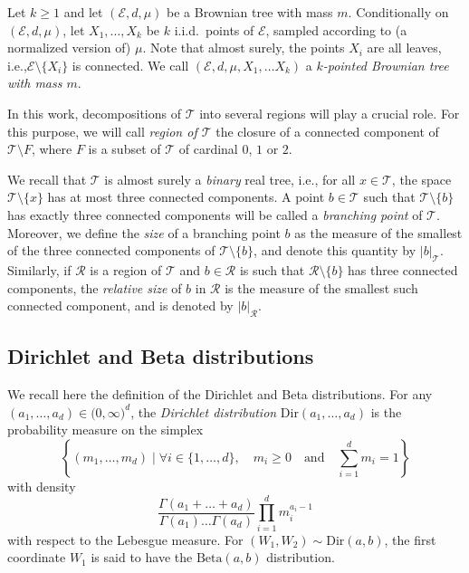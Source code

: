 \documentclass[11pt]{article}
\newcommand{\ie}{i.e.,\xspace}
\let\backslash\setminus
\newcommand{\intervalle}[4]{\mathopen{#1}#2\mathclose{}\mathpunct{},#3\mathclose{#4}}
\newcommand{\intervalleoo}[2]{\intervalle{(}{#1}{#2}{)}}
\newcommand{\Tt}{\mathcal{T}}
\newcommand{\Rr}{\mathcal{R}}
\newcommand{\Dir}{\mathrm{Dir}}
\theoremstyle{plain}
\theoremstyle{definition}
\numberwithin{equation}{section}
\begin{document}
Let $k \geq 1$ and let $(\mathcal{E},d,\mu)$ be a Brownian tree with mass $m$. Conditionally on $(\mathcal{E},d,\mu)$, let $X_1, \dots, X_k$ be $k$ i.i.d.\ points of $\mathcal{E}$, sampled according to (a normalized version of) $\mu$. Note that almost surely, the points $X_i$ are all leaves, \ie $\mathcal{E} \backslash \{X_i\}$ is connected. We call $(\mathcal{E},d,\mu,X_1,\dots X_k)$ a \emph{$k$-pointed Brownian tree with mass $m$}.

In this work, decompositions of $\Tt$ into several regions will play a crucial role. For this purpose, we will call \emph{region of $\Tt$} the closure of a connected component of $\Tt \backslash F$, where $F$ is a subset of $\Tt$ of cardinal $0$, $1$ or $2$.

We recall that $\Tt$ is almost surely a \emph{binary} real tree, \ie for all $x \in \Tt$, the space $\Tt \backslash \{x\}$ has at most three connected components. A point $b \in \Tt$ such that $\Tt \backslash \{ b \}$ has exactly three connected components will be called a \emph{branching point} of $\Tt$. Moreover, we define the \emph{size} of a branching point $b$ as the measure of the smallest of the three connected components of $\Tt \backslash \{b\}$, and denote this quantity by $|b|_{\Tt}$.
Similarly, if $\Rr$ is a region of $\Tt$ and $b \in \Rr$ is such that $\Rr \backslash \{b\}$ has three connected components, the \emph{relative size} of $b$ in $\Rr$ is the measure of the smallest such connected component, and is denoted by $|b|_{\Rr}$.
\subsection{Dirichlet and Beta distributions}
We recall here the definition of the Dirichlet and Beta distributions.
For any $(a_1,\dots, a_d)\in \intervalleoo{0}{\infty}^d$, the \emph{Dirichlet distribution} $\Dir \left(a_1, \dots, a_d\right)$ is the probability measure on the simplex\vspace*{-3pt}\enlargethispage{.5\baselineskip}
\[\textstyle \left\{ (m_1, \dots, m_{d}) \mid \forall i\in\{1,\dots,d\}, \quad m_i \geq 0 \quad \text{and} \quad \sum_{i=1}^{d} m_i=1 \right\}\]
with density\vspace*{-3pt}
\[ \frac{\Gamma(a_1+\dots + a_d)}{\Gamma(a_1)\dots \Gamma(a_d)} \prod_{i=1}^{d} m_i^{a_i-1} \]
with respect to the Lebesgue measure.
For $(W_1,W_2)\sim \Dir\left(a,b\right)$, the first coordinate $W_1$ is said to have the $\mathrm{Beta}(a,b)$ distribution.
\end{document}
